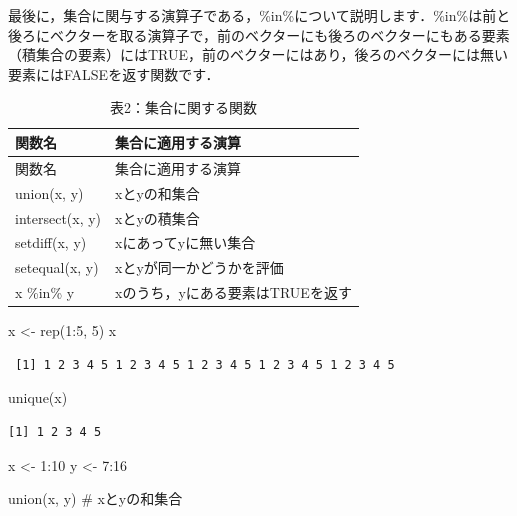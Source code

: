 \documentclass[
  letterpaper,
  DIV=11,
  numbers=noendperiod]{scrreprt}
\newenvironment{Shaded}{\begin{snugshade}}{\end{snugshade}}
\newcommand{\CommentTok}[1]{\textcolor[rgb]{0.37,0.37,0.37}{#1}}
\newcommand{\DecValTok}[1]{\textcolor[rgb]{0.68,0.00,0.00}{#1}}
\newcommand{\FunctionTok}[1]{\textcolor[rgb]{0.28,0.35,0.67}{#1}}
\newcommand{\NormalTok}[1]{\textcolor[rgb]{0.00,0.23,0.31}{#1}}
\newcommand{\OtherTok}[1]{\textcolor[rgb]{0.00,0.23,0.31}{#1}}
\newcommand{\SpecialCharTok}[1]{\textcolor[rgb]{0.37,0.37,0.37}{#1}}
\begin{document}
最後に，集合に関与する演算子である，\%in\%について説明します．\%in\%は前と後ろにベクターを取る演算子で，前のベクターにも後ろのベクターにもある要素（積集合の要素）にはTRUE，前のベクターにはあり，後ろのベクターには無い要素にはFALSEを返す関数です．

\begin{longtable}[]{@{}ll@{}}
\caption{表2：集合に関する関数}\tabularnewline
\toprule()
関数名 & 集合に適用する演算 \\
\midrule()
\endfirsthead
\toprule()
関数名 & 集合に適用する演算 \\
\midrule()
\endhead
union(x, y) & xとyの和集合 \\
intersect(x, y) & xとyの積集合 \\
setdiff(x, y) & xにあってyに無い集合 \\
setequal(x, y) & xとyが同一かどうかを評価 \\
x \%in\% y & xのうち，yにある要素はTRUEを返す \\
\bottomrule()
\end{longtable}

\begin{Shaded}
\begin{Highlighting}[]
\NormalTok{x }\OtherTok{\textless{}{-}} \FunctionTok{rep}\NormalTok{(}\DecValTok{1}\SpecialCharTok{:}\DecValTok{5}\NormalTok{, }\DecValTok{5}\NormalTok{)}
\NormalTok{x}
\end{Highlighting}
\end{Shaded}

\begin{verbatim}
 [1] 1 2 3 4 5 1 2 3 4 5 1 2 3 4 5 1 2 3 4 5 1 2 3 4 5
\end{verbatim}

\begin{Shaded}
\begin{Highlighting}[]
\FunctionTok{unique}\NormalTok{(x)}
\end{Highlighting}
\end{Shaded}

\begin{verbatim}
[1] 1 2 3 4 5
\end{verbatim}

\begin{Shaded}
\begin{Highlighting}[]
\NormalTok{x }\OtherTok{\textless{}{-}} \DecValTok{1}\SpecialCharTok{:}\DecValTok{10}
\NormalTok{y }\OtherTok{\textless{}{-}} \DecValTok{7}\SpecialCharTok{:}\DecValTok{16}

\FunctionTok{union}\NormalTok{(x, y) }\CommentTok{\# xとyの和集合}
\end{Highlighting}
\end{Shaded}
\end{document}

